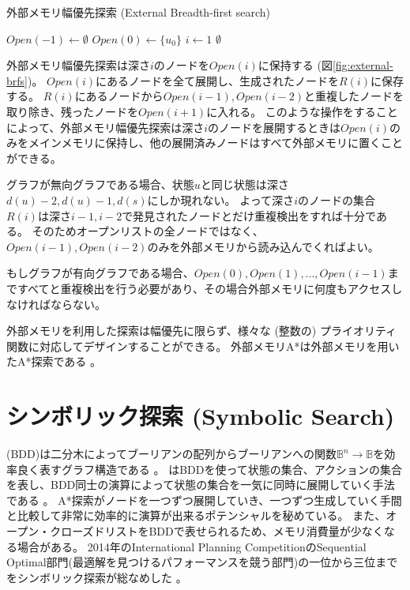 \begin{algorithm}
\caption{外部メモリ幅優先探索 (External Breadth-first search)}
\label{alg:external-brfs}
	$Open(-1) \leftarrow \emptyset$\;
	$Open(0) \leftarrow \{u_0\}$\;
	$i \leftarrow 1$\;
	\Return $\emptyset$\;
\end{algorithm}

外部メモリ幅優先探索は深さ$i$のノードを$Open(i)$に保持する (図\ref{fig:external-brfs})。
$Open(i)$にあるノードを全て展開し、生成されたノードを$R(i)$に保存する。
$R(i)$にあるノードから$Open(i-1), Open(i-2)$と重複したノードを取り除き、残ったノードを$Open(i+1)$に入れる。
このような操作をすることによって、外部メモリ幅優先探索は深さ$i$のノードを展開するときは$Open(i)$のみをメインメモリに保持し、他の展開済みノードはすべて外部メモリに置くことができる。

グラフが無向グラフである場合、状態$u$と同じ状態は深さ$d(u)-2, d(u)-1, d(s)$にしか現れない。
よって深さ$i$のノードの集合$R(i)$は深さ$i-1, i-2$で発見されたノードとだけ重複検出をすれば十分である。
そのためオープンリストの全ノードではなく、$Open(i-1), Open(i-2)$のみを外部メモリから読み込んでくればよい。

もしグラフが有向グラフである場合、$Open(0), Open(1), ..., Open(i-1)$まですべてと重複検出を行う必要があり、その場合外部メモリに何度もアクセスしなければならない。


外部メモリを利用した探索は幅優先に限らず、様々な (整数の) プライオリティ関数に対応してデザインすることができる。
外部メモリA*は外部メモリを用いたA*探索である \cite{edelkamp2004external}。


\section{シンボリック探索 (Symbolic Search)}
\label{sec:symbolic-search}
 (BDD)は二分木によってブーリアンの配列からブーリアンへの関数$\mathbb{B}^n \rightarrow \mathbb{B}$を効率良く表すグラフ構造である \cite{akers1978binary,bryant1992symbolic}。
はBDDを使って状態の集合、アクションの集合を表し、BDD同士の演算によって状態の集合を一気に同時に展開していく手法である \cite{edelkamp1998obdds,Edelkamp99deterministicstate}。
A*探索がノードを一つずつ展開していき、一つずつ生成していく手間と比較して非常に効率的に演算が出来るポテンシャルを秘めている。
また、オープン・クローズドリストをBDDで表せられるため、メモリ消費量が少なくなる場合がある。
2014年のInternational Planning CompetitionのSequential Optimal部門(最適解を見つけるパフォーマンスを競う部門)の一位から三位までをシンボリック探索が総なめした \cite{vallati20152014}。


